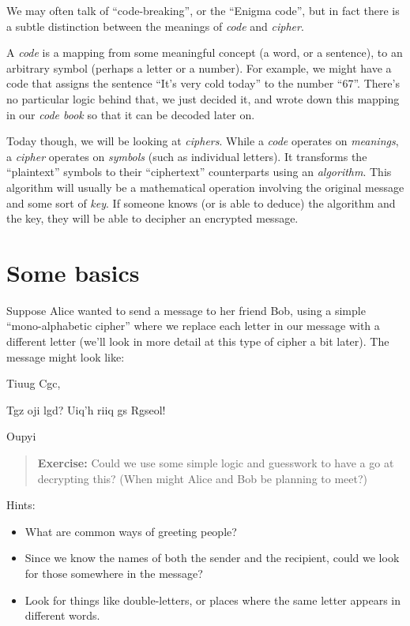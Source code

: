 \documentclass[
  letterpaper,
  DIV=11,
  numbers=noendperiod]{scrreprt}
\providecommand{\tightlist}{%
  \setlength{\itemsep}{0pt}\setlength{\parskip}{0pt}}\usepackage{longtable,booktabs,array}
\begin{document}
We may often talk of ``code-breaking'', or the ``Enigma code'', but in
fact there is a subtle distinction between the meanings of \emph{code}
and \emph{cipher}.

A \emph{code} is a mapping from some meaningful concept (a word, or a
sentence), to an arbitrary symbol (perhaps a letter or a number). For
example, we might have a code that assigns the sentence ``It's very cold
today'' to the number ``67''. There's no particular logic behind that,
we just decided it, and wrote down this mapping in our \emph{code book}
so that it can be decoded later on.

Today though, we will be looking at \emph{ciphers}. While a \emph{code}
operates on \emph{meanings}, a \emph{cipher} operates on \emph{symbols}
(such as individual letters). It transforms the ``plaintext'' symbols to
their ``ciphertext'' counterparts using an \emph{algorithm}. This
algorithm will usually be a mathematical operation involving the
original message and some sort of \emph{key}. If someone knows (or is
able to deduce) the algorithm and the key, they will be able to decipher
an encrypted message.

\hypertarget{some-basics}{%
\section{Some basics}\label{some-basics}}

Suppose Alice wanted to send a message to her friend Bob, using a simple
``mono-alphabetic cipher'' where we replace each letter in our message
with a different letter (we'll look in more detail at this type of
cipher a bit later). The message might look like:

Tiuug Cgc,

Tgz oji lgd? Uiq'h riiq gs Rgseol!

Oupyi

\begin{quote}
\textbf{Exercise:} Could we use some simple logic and guesswork to have
a go at decrypting this? (When might Alice and Bob be planning to meet?)
\end{quote}

Hints:

\begin{itemize}
\tightlist
\item
  What are common ways of greeting people?
\item
  Since we know the names of both the sender and the recipient, could we
  look for those somewhere in the message?
\item
  Look for things like double-letters, or places where the same letter
  appears in different words.
\end{itemize}
\end{document}
